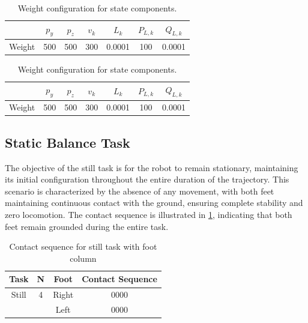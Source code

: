 \documentclass[main.tex]{subfiles}
\begin{document}
\begin{table}[h!]
    \centering
    \begin{tabular}{lcccccc}
        \toprule
        & $p_y$ & $p_z$ & $v_k$ & $L_k$ & $P_{L,k}$ & $Q_{L,k}$ \\
        \midrule
        Weight & 500 & 500 & 300 & 0.0001 & 100 & 0.0001 \\
        \bottomrule
    \end{tabular}
    \caption{Weight configuration for state components.}
\end{table}

\begin{table}[h!]
    \centering
    \begin{tabular}{l|c|c|c|c|c|c}
        & $p_y$ & $p_z$ & $v_k$ & $L_k$ & $P_{L,k}$ & $Q_{L,k}$ \\
        \midrule
        Weight & 500 & 500 & 300 & 0.0001 & 100 & 0.0001 \\
    \end{tabular}
    \caption{Weight configuration for state components.}
\end{table}





\subsection{Static Balance Task}
The objective of the still task is for the robot to remain stationary, maintaining its initial configuration throughout the entire duration of the trajectory. This scenario is characterized by the absence of any movement, with both feet maintaining continuous contact with the ground, ensuring complete stability and zero locomotion. The contact sequence is illustrated in \ref{tab:stilltask}, indicating that both feet remain grounded during the entire task. \\ 
\begin{table}[h!]
    \label{tab:stilltask}
    \centering
    \begin{tabular}{|c|c|c|c|}
        \hline
        Task & N & Foot & Contact Sequence \\
        \hline
        Still & 4 & Right & 0000 \\
        & & Left & 0000 \\
        \hline
    \end{tabular}
    \caption{Contact sequence for still task with foot column}
\end{table}
\end{document}
